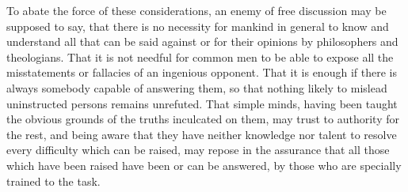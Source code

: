 \documentclass[11pt,openany]{book}
\begin{document}
To abate the force of these considerations, an enemy of free discussion may be supposed to say, that there is no necessity for mankind in general to know and understand all that can be said against or for their opinions by philosophers and theologians. That it is not needful for common men to be able to expose all the misstatements or fallacies of an ingenious opponent. That it is enough if there is always somebody capable of answering them, so that nothing likely to mislead uninstructed persons remains unrefuted. That simple minds, having been taught the obvious grounds of the truths inculcated on them, may trust to authority for the rest, and being aware that they have neither knowledge nor talent to resolve every difficulty which can be raised, may repose in the assurance that all those which have been raised have been or can be answered, by those who are specially trained to the task.
\end{document}
